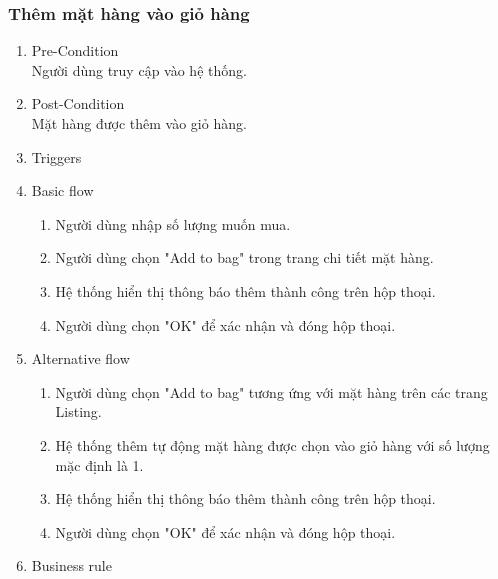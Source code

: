 \subsubsection{Thêm mặt hàng vào giỏ hàng}
\begin{enumerate}
	\item Pre-Condition\\
	Người dùng truy cập vào hệ thống.
	\item Post-Condition\\
	Mặt hàng được thêm vào giỏ hàng.
	\item Triggers
	\item Basic flow
	\begin{enumerate}
		\item Người dùng nhập số lượng muốn mua.
		\item Người dùng chọn "Add to bag" trong trang chi tiết mặt hàng.
		\item Hệ thống hiển thị thông báo thêm thành công trên hộp thoại.
		\item Người dùng chọn "OK" để xác nhận và đóng hộp thoại.
	\end{enumerate}
	\item Alternative flow
	\begin{enumerate}
		\item Người dùng chọn "Add to bag" tương ứng với mặt hàng trên các trang Listing.
		\item Hệ thống thêm tự động mặt hàng được chọn vào giỏ hàng với số lượng mặc định là 1.
		\item Hệ thống hiển thị thông báo thêm thành công trên hộp thoại.
		\item Người dùng chọn "OK" để xác nhận và đóng hộp thoại. 
	\end{enumerate}	
	\item Business rule
\end{enumerate}

